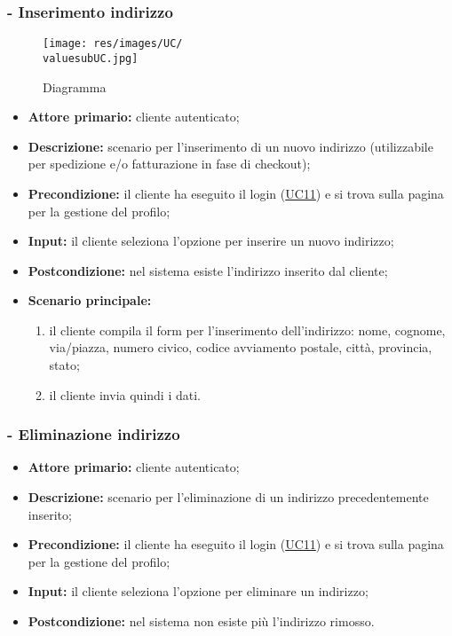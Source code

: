 \subsubsection{ - Inserimento indirizzo}
\begin{figure}[H]
    \centering
    \texttt{[image: res/images/UC/\\valuesubUC.jpg]}
    \caption{Diagramma }
\end{figure}
\begin{itemize}
    \item \textbf{Attore primario:} cliente autenticato;
    \item \textbf{Descrizione:} scenario per l'inserimento di un nuovo indirizzo (utilizzabile per spedizione e/o fatturazione in fase di checkout);
    \item \textbf{Precondizione:} il cliente ha eseguito il login (\hyperref[UC11]{UC11}) e si trova sulla pagina per la gestione del profilo;
    \item \textbf{Input:} il cliente seleziona l'opzione per inserire un nuovo indirizzo;
    \item \textbf{Postcondizione:} nel sistema esiste l'indirizzo inserito dal cliente;
    \item \textbf{Scenario principale:}
          \begin{enumerate}
              \item il cliente compila il form per l'inserimento dell'indirizzo: nome, cognome, via/piazza, numero civico, codice avviamento postale, città, provincia, stato;
              \item il cliente invia quindi i dati.
          \end{enumerate}
\end{itemize}

\stepsubUserCase
\subsubsection{ - Eliminazione indirizzo}
\begin{itemize}
    \item \textbf{Attore primario:} cliente autenticato;
    \item \textbf{Descrizione:} scenario per l'eliminazione di un indirizzo precedentemente inserito;
    \item \textbf{Precondizione:} il cliente ha eseguito il login (\hyperref[UC11]{UC11}) e si trova sulla pagina per la gestione del profilo;
    \item \textbf{Input:} il cliente seleziona l'opzione per eliminare un indirizzo;
    \item \textbf{Postcondizione:} nel sistema non esiste più l'indirizzo rimosso.
\end{itemize}


